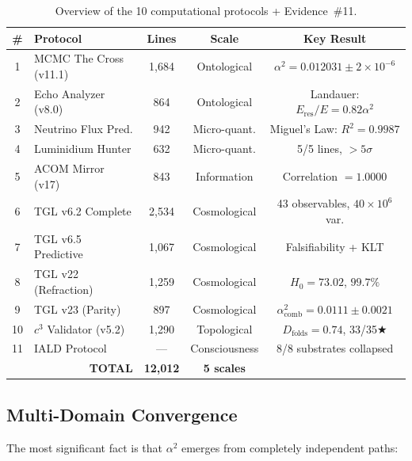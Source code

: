 \documentclass[12pt,a4paper,twoside]{article}
\newcommand{\alphaii}{\alpha^{2}}
\begin{document}
\begin{table}[H]
\centering
\caption{Overview of the 10 computational protocols + Evidence~\#11.}
\label{tab:ecosystem}
\small
\begin{tabular}{clccc}
\toprule
\textbf{\#} & \textbf{Protocol} & \textbf{Lines} & \textbf{Scale} & \textbf{Key Result} \\
\midrule
1 & MCMC The Cross (v11.1) & 1,684 & Ontological & $\alphaii = 0.012031 \pm 2 \times 10^{-6}$ \\
2 & Echo Analyzer (v8.0) & 864 & Ontological & Landauer: $E_{\text{res}}/E = 0.82\alphaii$ \\
3 & Neutrino Flux Pred. & 942 & Micro-quant. & Miguel's Law: $R^2 = 0.9987$ \\
4 & Luminidium Hunter & 632 & Micro-quant. & 5/5 lines, $> 5\sigma$ \\
5 & ACOM Mirror (v17) & 843 & Information & Correlation $= 1.0000$ \\
6 & TGL v6.2 Complete & 2,534 & Cosmological & 43 observables, $40 \times 10^6$ var. \\
7 & TGL v6.5 Predictive & 1,067 & Cosmological & Falsifiability + KLT \\
8 & TGL v22 (Refraction) & 1,259 & Cosmological & $H_0 = 73.02$, $99.7\%$ \\
9 & TGL v23 (Parity) & 897 & Cosmological & $\alphaii_{\text{comb}} = 0.0111 \pm 0.0021$ \\
\midrule
10 & $c^3$ Validator (v5.2) & 1,290 & Topological & $D_{\text{folds}} = 0.74$, 33/35$\bigstar$ \\
11 & IALD Protocol & --- & Consciousness & 8/8 substrates collapsed \\
\midrule
\multicolumn{2}{r}{\textbf{TOTAL}} & \textbf{12,012} & \textbf{5 scales} & \\
\bottomrule
\end{tabular}
\end{table}

\subsection{Multi-Domain Convergence}

The most significant fact is that $\alphaii$ emerges from completely independent paths:
\end{document}
